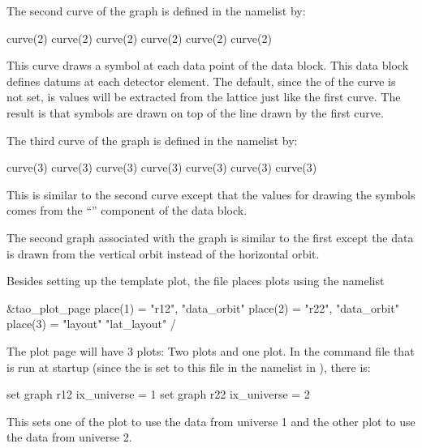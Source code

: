 \documentclass{hitec}     %
\begin{document}
{The second curve of the graph is defined in the namelist by:
\begin{code}
  curve(2)%
  curve(2)%
  curve(2)%
  curve(2)%
  curve(2)%
  curve(2)%
\end{code}
This curve draws a symbol at each data point of the  data block.  This
data block defines datums at each detector element. The default, since the  of the
curve is not set, is values will be extracted from the  lattice just like the first
curve. The result is that symbols are drawn on top of the line drawn by the first curve.

The third curve of the graph is defined in the namelist by:
\begin{code}
  curve(3)%
  curve(3)%
  curve(3)%
  curve(3)%
  curve(3)%
  curve(3)%
  curve(3)%
\end{code}
This is similar to the second curve except that the values for drawing the symbols comes from the
``'' component of the  data block.

The second graph associated with the  graph is similar to the first except the data is drawn
from the vertical orbit instead of the horizontal orbit.

Besides setting up the  template plot, the  file places plots using
the  namelist
\begin{code}
&tao_plot_page
  place(1) = "r12",   "data_orbit"
  place(2) = "r22",   "data_orbit"
  place(3) = "layout" "lat_layout"
/
\end{code}
The plot page will have 3 plots: Two  plots and one  plot. In the
 command file that is run at startup (since the  is set to this file
in the  namelist in ), there is:
\begin{code}
set graph r12 ix_universe = 1
set graph r22 ix_universe = 2
\end{code}
This sets one of the  plot to use the data from universe 1 and the other
 plot to use the data from universe 2.

}
\end{document}
